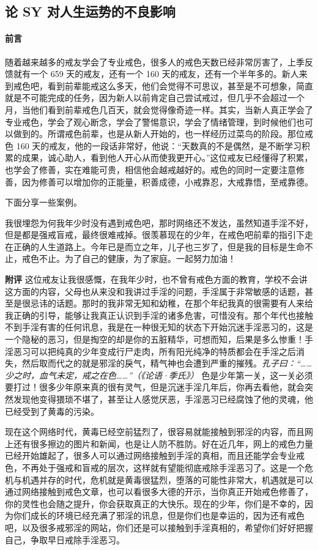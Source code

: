 \subsection{论 SY 对人生运势的不良影响}

\paragraph*{前言}

随着越来越多的戒友学会了专业戒色，很多人的戒色天数已经非常厉害了，上季反馈就有一个 659 天的戒友，还有一个 160 天的戒友，还有一个半年多的。新人来到戒色吧，看到前辈能戒这么多天，他们会觉得不可思议，甚至是不可想象，简直就是不可能完成的任务，因为新人以前肯定自己尝试戒过，但几乎不会超过一个月，当他们看到前辈戒色几百天，就会觉得像奇迹一样。其实，当新人真正学会了专业戒色，学会了观心断念，学会了警惕意识，学会了情绪管理，到时候他们也可以做到的。所谓戒色前辈，也是从新人开始的，也一样经历过菜鸟的阶段。那位戒色 160 天的戒友，他的一段话非常好，他说：“天数真的不是偶然，是不断学习积累的成果，诚心助人，看到他人开心从而使我更开心。”这位戒友已经懂得了积累，也学会了修善，实在难能可贵，相信他会越戒越好的。戒色的同时一定要注意修善，因为修善可以增加你的正能量，积善成德，小戒靠忍，大戒靠悟，至戒靠德。

下面分享一些案例。

\begin{case}
    我很埋怨为何我年少时没有遇到戒色吧，那时网络还不发达，虽然知道手淫不好，但是都是强戒盲戒，最终很难戒掉。很羡慕现在的少年，在戒色吧前辈的指引下走在正确的人生道路上。今年已是而立之年，儿子也三岁了，但是我的目标是生命不止，戒色不止。为了自己的健康，为了家庭。一起努力加油！

    \textbf{附评} 这位戒友让我很感慨，在我年少时，也不曾有戒色方面的教育，学校不会讲这方面的内容，父母也从来没和我讲过手淫的问题，手淫属于非常敏感的话题，甚至是很忌讳的话题。那时的我非常无知和幼稚，在那个年纪我真的很需要有人来给我正确的引导，能够让我真正认识到手淫的诸多危害，可惜没有。那个年代也接触不到手淫有害的任何讯息，我是在一种很无知的状态下开始沉迷手淫恶习的，这是一个隐秘的恶习，但是掏空的却是你的五脏精华，可想而知，后果是多么惨重！手淫恶习可以把纯真的少年变成行尸走肉，所有阳光纯净的特质都会在手淫之后消失，然后取而代之的就是邪淫的戾气，精气神也会遭到严重的摧残。\textit{孔子曰：“……少之时，血气未定，戒之在色……”（《论语·季氏》）} 色是少年第一关，这一关必须要打过！很多少年原来真的很有灵气，但是沉迷手淫几年后，你再去看他，就会突然发现他变得猥琐不堪了，甚至让人感觉厌恶，手淫恶习已经腐蚀了他的灵魂，他已经受到了黄毒的污染。

    现在这个网络时代，黄毒已经空前猛烈了，很容易就能接触到邪淫的内容，而且网上还有很多擦边的图片和新闻，也是让人防不胜防。好在近几年，网上的戒色力量已经开始雄起了，很多人可以通过网络接触到手淫的真相，而且还能学会专业戒色，不再处于强戒和盲戒的层次，这样就有望能彻底戒除手淫恶习了。这是一个危机与机遇并存的时代，危机就是黄毒很猛烈，堕落的可能性非常大，机遇就是可以通过网络接触到戒色文章，也可以看很多大德的开示，当你真正开始戒色修善了，你的灵性也会随之提升，你会获取真正的大快乐。现在的少年，你们是不幸的，因为你们成长的环境已经充满了邪淫的讯息，但是你们也是幸运的，因为还有戒色吧，以及很多戒邪淫的网站，你们还是可以接触到手淫真相的，希望你们好好把握自己，争取早日戒除手淫恶习。
\end{case}

